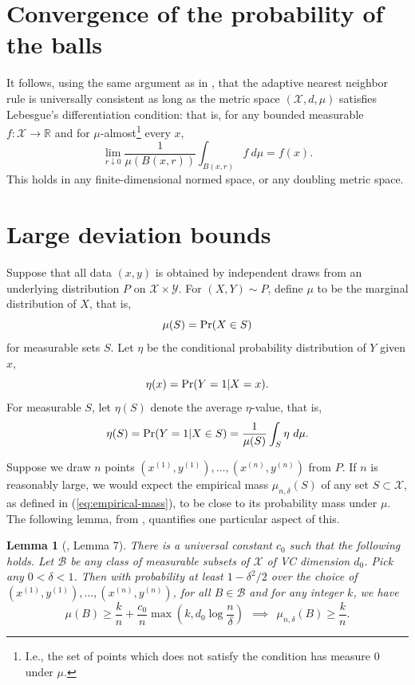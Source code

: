 \documentclass{article}
\def\R{{\mathbb{R}}}
\def\pr{{\rm Pr}}
\def\X{{\mathcal X}}
\def\Y{{\mathcal Y}}
\def\B{{\mathcal B}}
\newtheorem{lemma}[theorem]{Lemma}
\newcommand{\comment}[3]{}  %
\newcommand{\shay}[1]{\comment{purple}{Shay}{#1}}
\begin{document}
\section{Convergence of the probability of the balls}
It follows, using the same argument as in \cite{ChaudhuriDasgupta2014}, that the adaptive nearest neighbor rule is universally consistent as long as the metric space $(\X, d, \mu)$ satisfies Lebesgue's differentiation condition: that is, for any bounded measurable $f: \X \rightarrow \R$ and for $\mu$-almost\footnote{I.e., the set of points which does not satisfy the condition has measure $0$ under $\mu$.} every $x$,
$$ \lim_{r \downarrow 0} \frac{1}{\mu(B(x,r))} \int_{B(x,r)} f \ d\mu = f(x) .$$
This holds in any finite-dimensional normed space, or any doubling metric space.
\shay{In order for consistency to hold, 
one should tune $\delta= \delta(n)$ such that $\delta(n)\to_{n\to\infty} 0$.
(note that $\delta$ is a parameter of our algorithm, unlike in \cite{ChaudhuriDasgupta2014}, where $\delta$
was just defined for sake of analysis). }



\section{Large deviation bounds}

Suppose that all data $(x,y)$ is obtained by independent draws from an underlying distribution $P$ on $\X \times \Y$. For $(X,Y) \sim P$, define $\mu$ to be the marginal distribution of $X$, that is,
$$ \mu(S) = \pr(X \in S) $$
for measurable sets $S$. Let $\eta$ be the conditional probability distribution of $Y$ given $x$,
$$ \eta(x) = \pr(Y = 1| X = x) .$$
For measurable $S$, let $\eta(S)$ denote the average $\eta$-value, that is,
$$ \eta(S) = \pr(Y = 1| X \in S) = \frac{1}{\mu(S)} \int_S \eta \ d \mu .$$

Suppose we draw $n$ points $(x^{(1)}, y^{(1)}), \ldots, (x^{(n)}, y^{(n)})$ from $P$. If $n$ is reasonably large, we would expect the empirical mass $\mu_{n,\delta}(S)$ of any set $S \subset \X$, as defined in (\ref{eq:empirical-mass}), to be close to its probability mass under $\mu$. The following lemma, from \cite{ChaudhuriDasgupta2010}, quantifies one particular aspect of this.
\begin{lemma}[\cite{ChaudhuriDasgupta2010}, Lemma 7]
There is a universal constant $c_0$ such that the following holds. Let $\B$ be any class of measurable subsets of $\X$ of VC dimension $d_0$. Pick any $0 < \delta < 1$. Then with probability at least $1-\delta^2/2$ over the choice of $(x^{(1)}, y^{(1)}), \ldots, (x^{(n)}, y^{(n)})$, for all $B \in \B$ and for any integer $k$, we have
$$ \mu(B) \geq \frac{k}{n} + \frac{c_0}{n} \max \left( k, d_0 \log \frac{n}{\delta} \right)
\ \ \implies \ \ 
\mu_{n,\delta}(B) \geq \frac{k}{n} .$$
\label{lemma:points-in-balls}
\end{lemma}
\end{document}
